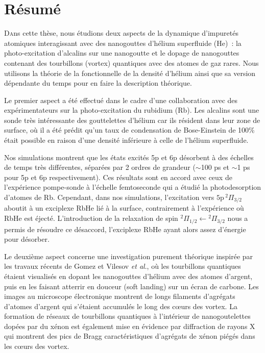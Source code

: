 \chapter{Résumé}
	\lettrine[lines=4]{\color{activeColor}D}{a}ns cette thèse, nous étudions deux aspects de la dynamique d'impuretés atomiques interagissant avec des nanogouttes d'hélium superfluide (He)~: la photo-excitation d'alcalins sur une nanogoutte et le dopage de nanogouttes contenant des tourbillons (vortex) quantiques avec des atomes de gaz rares. Nous utilisons la théorie de la fonctionnelle de la densité d'hélium ainsi que sa version dépendante du temps pour en faire la description théorique.

	Le premier aspect a été effectué dans le cadre d'une collaboration avec des expérimentateurs sur la photo-excitation du rubidium (Rb). Les alcalins sont une sonde très intéressante des gouttelettes d'hélium car ils résident dans leur zone de surface, où il a été prédit qu'un taux de condensation de Bose-Einstein de 100\% était possible en raison d'une densité inférieure à celle de l'hélium superfluide.

	Nos simulations montrent que les états excités 5p et 6p désorbent à des échelles de temps très différentes, séparées par 2 ordres de grandeur ($\sim$100 ps et $\sim$1 ps pour  5p et 6p respectivement). Ces résultats sont en accord avec ceux de l'expérience pompe-sonde à l'échelle femtoseconde qui a étudié la photodesorption d'atomes de Rb. Cependant, dans nos simulations, l'excitation vers $5\mathrm{p}\,^2\Pi_{3/2}$ aboutit à un exciplexe RbHe lié à la surface, contrairement à l'expérience où RbHe est éjecté. L'introduction de la relaxation de spin $^2\Pi_{1/2}\leftarrow{^ 2}\Pi_{3/2}$ nous a permis de résoudre ce désaccord, l'exciplexe RbHe ayant alors assez d'énergie pour désorber. 

	Le deuxième aspect concerne une investigation purement théorique inspirée par les travaux récents de Gomez et Vilesov \emph{et al}., où les tourbillons quantiques étaient visualisés en dopant les nanogouttes d'hélium avec des atomes d'argent, puis en les faisant atterrir en douceur (soft landing) sur un écran de carbone. Les images au microscope électronique montrent de longs filaments d'agrégats d'atomes d'argent qui s'étaient accumulés le long des c\oe urs des vortex. La formation de réseaux de tourbillons quantiques à l'intérieur de nanogoutelettes dopées par du xénon est également mise en évidence par diffraction de rayons X qui montrent des pics de Bragg caractéristiques d'agrégats de xénon piégés dans les c\oe urs des vortex.

